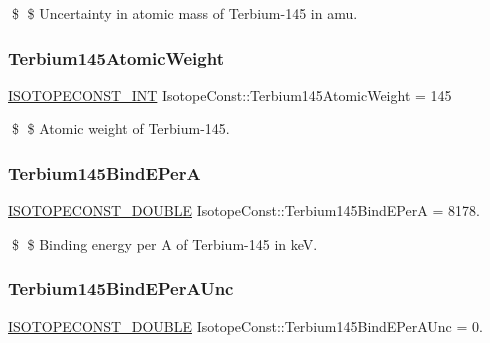 \$ \$ Uncertainty in atomic mass of Terbium-\/145 in amu. \mbox{\label{group___isotope_const-_terbium-_tb145_gaccbdf6a4de89bb9950de9380c2ea36c1}} 
\subsubsection{\texorpdfstring{Terbium145\+Atomic\+Weight}{Terbium145AtomicWeight}}
{\footnotesize\ttfamily \mbox{\hyperlink{group___isotope_const-_macros_ga5f18360b3e99483a35c32d789e62621c}{I\+S\+O\+T\+O\+P\+E\+C\+O\+N\+S\+T\+\_\+\+I\+NT}} Isotope\+Const\+::\+Terbium145\+Atomic\+Weight = 145}

\$ \$ Atomic weight of Terbium-\/145. \mbox{\label{group___isotope_const-_terbium-_tb145_ga07b67c6b5104ab8861823d92b6d79b02}} 
\subsubsection{\texorpdfstring{Terbium145\+Bind\+E\+PerA}{Terbium145BindEPerA}}
{\footnotesize\ttfamily \mbox{\hyperlink{group___isotope_const-_macros_ga8f45a7272ce02c0b4c65c44636ed719a}{I\+S\+O\+T\+O\+P\+E\+C\+O\+N\+S\+T\+\_\+\+D\+O\+U\+B\+LE}} Isotope\+Const\+::\+Terbium145\+Bind\+E\+PerA = 8178.}

\$ \$ Binding energy per A of Terbium-\/145 in keV. \mbox{\label{group___isotope_const-_terbium-_tb145_gab0081ec01ed0d09fe0045d7da91035b2}} 
\subsubsection{\texorpdfstring{Terbium145\+Bind\+E\+Per\+A\+Unc}{Terbium145BindEPerAUnc}}
{\footnotesize\ttfamily \mbox{\hyperlink{group___isotope_const-_macros_ga8f45a7272ce02c0b4c65c44636ed719a}{I\+S\+O\+T\+O\+P\+E\+C\+O\+N\+S\+T\+\_\+\+D\+O\+U\+B\+LE}} Isotope\+Const\+::\+Terbium145\+Bind\+E\+Per\+A\+Unc = 0.}

